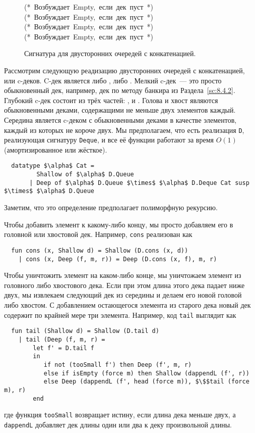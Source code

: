 \begin{figure}
  \centering
  
  (*\mbox{ Возбуждает }Empty\mbox{, если дек пуст }*)\\
  (*\mbox{ Возбуждает }Empty\mbox{, если дек пуст }*)\\
  (*\mbox{ Возбуждает }Empty\mbox{, если дек пуст }*)\\
  (*\mbox{ Возбуждает }Empty\mbox{, если дек пуст }*)\\
  
  \caption{Сигнатура для двусторонних очередей с конкатенацией.}
  \label{fig:11.2}
\end{figure}

Рассмотрим следующую реадизацию двусторонних очередей с конкатенацией,
или c-деков. C-дек является либо , либо
. Мелкий c-дек~--- это просто обыкновенный дек,
например, дек по методу банкира из Раздела~\ref{sc:8.4.2}. Глубокий
c-дек состоит из трёх частей: ,
 и . Голова и хвост являются
обыкновенными деками, содержащими не меньше двух элементов
каждый. Середина является c-деком с обыкновенными деками в качестве
элементов, каждый из которых не короче двух. Мы предполагаем, что есть
реализация \lstinline!D!, реализующая сигнатуру \lstinline!Deque!, и
все её функции работают за время $O(1)$ (амортизированное или
жёсткое).
\begin{lstlisting}
  datatype $\alpha$ Cat =
         Shallow of $\alpha$ D.Queue
       | Deep of $\alpha$ D.Queue $\times$ $\alpha$ D.Deque Cat susp $\times$ $\alpha$ D.Queue
\end{lstlisting}
Заметим, что это определение предполагает полиморфную рекурсию.

Чтобы добавить элемент к какому-либо концу, мы просто добавляем его в
головной или хвостовой дек. Например, \lstinline!cons! реализован как
\begin{lstlisting}
  fun cons (x, Shallow d) = Shallow (D.cons (x, d))
    | cons (x, Deep (f, m, r)) = Deep (D.cons (x, f), m, r)
\end{lstlisting}
Чтобы уничтожить элемент на каком-либо конце, мы уничтожаем элемент из
головного либо хвостового дека. Если при этом длина этого дека падает
ниже двух, мы извлекаем следующий дек из середины и делаем его новой
головой либо хвостом. С добавлением остающегося элемента из старого
дека новый дек содержит по крайней мере три элемента. Например, код
\lstinline!tail! выглядит как
\begin{lstlisting}
  fun tail (Shallow d) = Shallow (D.tail d)
    | tail (Deep (f, m, r) =
        let f' = D.tail f
        in
           if not (tooSmall f') then Deep (f', m, r)
           else if isEmpty (force m) then Shallow (dappendL (f', r))
           else Deep (dappendL (f', head (force m)), $\$$tail (force m), r)
        end
\end{lstlisting}
где функция \lstinline!tooSmall! возвращает истину, если длина дека
меньше двух, а \lstinline!dappendL! добавляет дек длины один или два к
деку произвольной длины.

